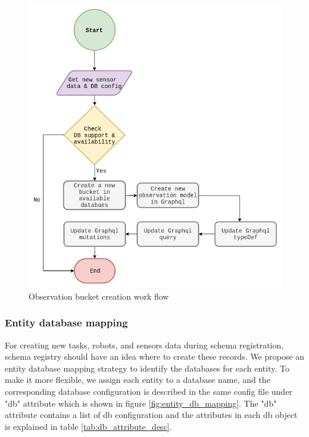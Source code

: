 	\begin{figure}[!htbp] 
		\begin{center}
			\includegraphics[scale=0.5]{./images/png/implementation/observation_creation}	
			\caption{Observation bucket creation work flow}	
			\label{fig:observation_creation}	
		\end{center}
	\end{figure}

	\subsubsection{Entity database mapping}
	For creating new tasks, robots, and sensors data during schema registration, schema registry should have an idea where to create these records. We propose an entity database mapping strategy to identify the databases for each entity. To make it more flexible, we assign each entity to a database name, and the corresponding database configuration is described in the same config file under "db" attribute which is shown in figure \ref{fig:entity_db_mapping}. The "db" attribute contains a list of db configuration and the attributes in each db object is explained in table \ref{tab:db_attribute_desc}. 
	
